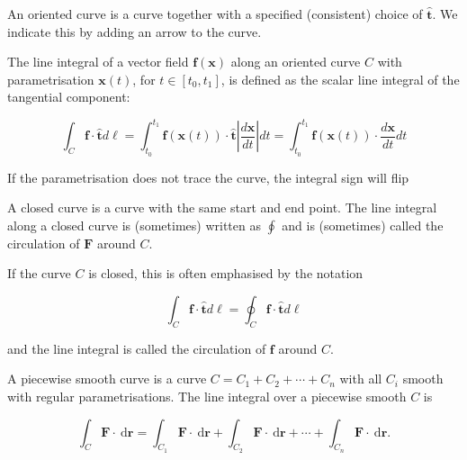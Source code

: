 \begin{ndefi}
	An oriented curve is a curve together with a specified (consistent) choice of $\hat{\boldsymbol{t}}$. We indicate this by adding an arrow to the curve.
\end{ndefi}

\begin{ndefi}
	The line integral of a vector field $\boldsymbol{f}(\boldsymbol{x})$ along an oriented curve $C$ with parametrisation $\boldsymbol{x}(t)$, for $t \in\left[t_0, t_1\right]$, is defined as the scalar line integral of the tangential component:
	
	$$
	\int_C \boldsymbol{f} \cdot \hat{\boldsymbol{t}} d \ell=\int_{t_0}^{t_1} \boldsymbol{f}(\boldsymbol{x}(t)) \cdot \hat{\boldsymbol{t}}\left|\frac{d \boldsymbol{x}}{d t}\right| d t=\int_{t_0}^{t_1} \boldsymbol{f}(\boldsymbol{x}(t)) \cdot \frac{d \boldsymbol{x}}{d t} d t
	$$
\end{ndefi}

\begin{nrem}
	If the parametrisation does not trace the curve, the integral sign will flip
\end{nrem}



\begin{ndefi}
	A closed curve is a curve with the same start and end point. The line integral along a closed curve is (sometimes) written as $\oint$ and is (sometimes) called the circulation of $\mathbf{F}$ around $C$.
\end{ndefi}

\begin{nrem}
	If the curve $C$ is closed, this is often emphasised by the notation
	
	$$
	\int_C \boldsymbol{f} \cdot \hat{\boldsymbol{t}} d \ell=\oint_C \boldsymbol{f} \cdot \hat{\boldsymbol{t}} d \ell
	$$
	
	and the line integral is called the circulation of $\boldsymbol{f}$ around $C$.
\end{nrem}

\begin{ndefi}
	A piecewise smooth curve is a curve $C=C_1+C_2+\cdots+C_n$ with all $C_i$ smooth with regular parametrisations. The line integral over a piecewise smooth $C$ is
	
	$$
	\int_C \mathbf{F} \cdot \mathrm{~d} \mathbf{r}=\int_{C_1} \mathbf{F} \cdot \mathrm{~d} \mathbf{r}+\int_{C_2} \mathbf{F} \cdot \mathrm{~d} \mathbf{r}+\cdots+\int_{C_n} \mathbf{F} \cdot \mathrm{~d} \mathbf{r} .
	$$
\end{ndefi}

